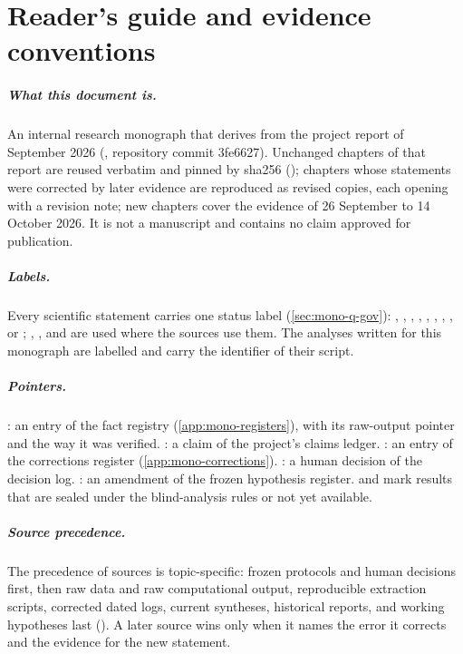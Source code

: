 \chapter*{Reader's guide and evidence conventions}
\label{ch:mono-guide}

\paragraph{What this document is.} An internal research monograph that derives from the project report of September
2026 (, repository commit 3fe6627). Unchanged chapters of that report are reused verbatim and
pinned by sha256 (); chapters whose statements were corrected by later
evidence are reproduced as revised copies, each opening with a revision note; new chapters cover the evidence of
26 September to 14 October 2026. It is not a manuscript and contains no claim approved for publication.

\paragraph{Labels.} Every scientific statement carries one status label (\cref{sec:mono-q-gov}): ,
, , , , , ,
,  or ; , ,  and
 are used where the sources use them. The analyses written for this monograph are labelled
 and carry the identifier of their script.

\paragraph{Pointers.} : an entry of the fact registry (\cref{app:mono-registers}), with its raw-output pointer and
the way it was verified. : a claim of the project's claims ledger. : an entry of the corrections
register (\cref{app:mono-corrections}). : a human decision of the decision log. : an amendment of the
frozen hypothesis register.  and  mark results that are sealed under the blind-analysis
rules or not yet available.

\paragraph{Source precedence.} The precedence of sources is topic-specific: frozen protocols and human decisions first,
then raw data and raw computational output, reproducible extraction scripts, corrected dated logs, current syntheses,
historical reports, and working hypotheses last (). A later source wins only when it names
the error it corrects and the evidence for the new statement.

